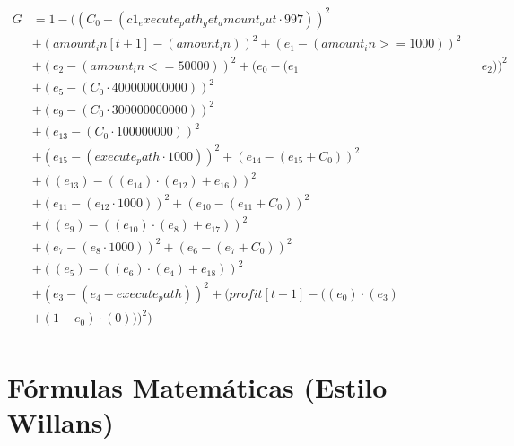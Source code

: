 \documentclass[10pt, a4paper]{article}
\begin{document}
\begin{small}
\begin{align*}
G &= 1 - ((C_{0} - (c1_execute_path_get_amount_out  \cdot  997))^{2} \\
& + (amount_in[t+1] - (amount_in))^{2} + (e_{1} - (amount_in >= 1000))^{2} \\
& + (e_{2} - (amount_in <= 50000))^{2} + (e_{0} - (e_{1} && e_{2}))^{2} \\
& + (e_{5} - (C_{0}  \cdot  400000000000))^{2} \\
& + (e_{9} - (C_{0}  \cdot  300000000000))^{2} \\
& + (e_{13} - (C_{0}  \cdot  100000000))^{2} \\
& + (e_{15} - (execute_path  \cdot  1000))^{2} + (e_{14} - (e_{15} + C_{0}))^{2} \\
& + ((e_{13}) - ((e_{14})  \cdot  (e_{12}) + e_{16}))^{2} \\
& + (e_{11} - (e_{12}  \cdot  1000))^{2} + (e_{10} - (e_{11} + C_{0}))^{2} \\
& + ((e_{9}) - ((e_{10})  \cdot  (e_{8}) + e_{17}))^{2} \\
& + (e_{7} - (e_{8}  \cdot  1000))^{2} + (e_{6} - (e_{7} + C_{0}))^{2} \\
& + ((e_{5}) - ((e_{6})  \cdot  (e_{4}) + e_{18}))^{2} \\
& + (e_{3} - (e_{4} - execute_path))^{2} + (profit[t+1] - ((e_{0})  \cdot  (e_{3}) \\
& + (1 - e_{0})  \cdot  (0)))^{2}) \\
\end{align*}
\end{small}\part{Fórmulas Matemáticas (Estilo Willans)}
\end{document}
